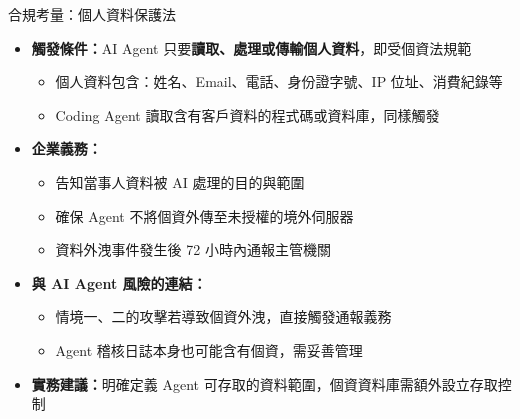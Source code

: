 \documentclass[aspectratio=1610]{Common/MyCourseBeamer}
\begin{document}
\begin{frame}[allowframebreaks=0.85]{合規考量：個人資料保護法}

	\begin{itemize}
		\item \textbf{觸發條件：}AI Agent 只要\textbf{讀取、處理或傳輸個人資料}，即受個資法規範
			\begin{itemize}
				\item 個人資料包含：姓名、Email、電話、身份證字號、IP 位址、消費紀錄等
				\item Coding Agent 讀取含有客戶資料的程式碼或資料庫，同樣觸發
			\end{itemize}

		\item \textbf{企業義務：}
			\begin{itemize}
				\item 告知當事人資料被 AI 處理的目的與範圍
				\item 確保 Agent 不將個資外傳至未授權的境外伺服器
				\item \alert{資料外洩事件發生後 72 小時內通報主管機關}
			\end{itemize}

		\framebreak
		\item \textbf{與 AI Agent 風險的連結：}
			\begin{itemize}
				\item 情境一、二的攻擊若導致個資外洩，直接觸發通報義務
				\item Agent 稽核日誌本身也可能含有個資，需妥善管理
			\end{itemize}

		\item \textbf{實務建議：}明確定義 Agent 可存取的資料範圍，個資資料庫需額外設立存取控制
	\end{itemize}

\end{frame}
\end{document}
